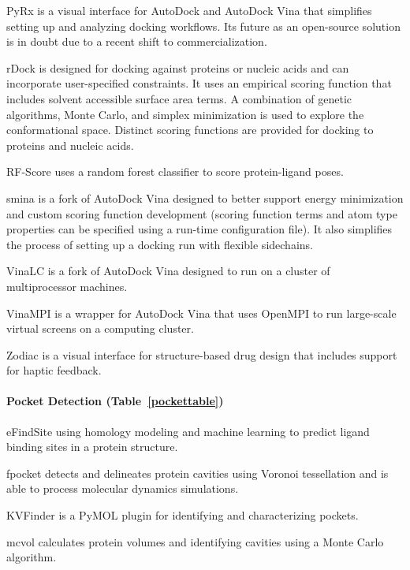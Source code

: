 PyRx \cite{Dallakyan_2014} is a visual interface for AutoDock and AutoDock Vina that simplifies setting up and analyzing docking workflows.  Its future as an open-source solution is in doubt due to a recent shift to commercialization.

rDock \cite{Ruiz_Carmona_2014}  is designed for docking against proteins or nucleic acids and can incorporate user-specified constraints. It uses an empirical scoring function that includes solvent accessible surface area terms. A combination of genetic algorithms, Monte Carlo, and simplex minimization is used to explore the conformational space. Distinct scoring functions are provided for docking to proteins and nucleic acids.

RF-Score \cite{Li_2015,Ballester_2010} uses a random forest classifier to score protein-ligand poses.

smina \cite{Koes_2013} is a fork of AutoDock Vina designed to better support energy minimization and custom scoring function development (scoring function terms and atom type properties can be specified using a run-time configuration file). It also simplifies the process of setting up a docking run with flexible sidechains.

VinaLC  \cite{Zhang_2013} is a fork of AutoDock Vina designed to run on a cluster of multiprocessor machines.

VinaMPI \cite{Ellingson_2013} is a wrapper for AutoDock Vina that uses OpenMPI to run large-scale virtual screens on a computing cluster.

Zodiac \cite{Zonta_2008} is a visual interface for structure-based drug design that includes support for haptic feedback.

\paragraph{Pocket Detection (Table~\ref{pockettable})}
eFindSite \cite{Brylinski_2013} using homology modeling and machine learning to predict ligand binding sites in a protein structure.

fpocket  \cite{Schmidtke_2011} detects and delineates protein cavities using Voronoi tessellation and is able to process molecular dynamics simulations.

KVFinder \cite{Oliveira_2014} is a PyMOL plugin for identifying and characterizing pockets.

mcvol \cite{Till_2009} calculates protein volumes and identifying cavities using a Monte Carlo algorithm.

